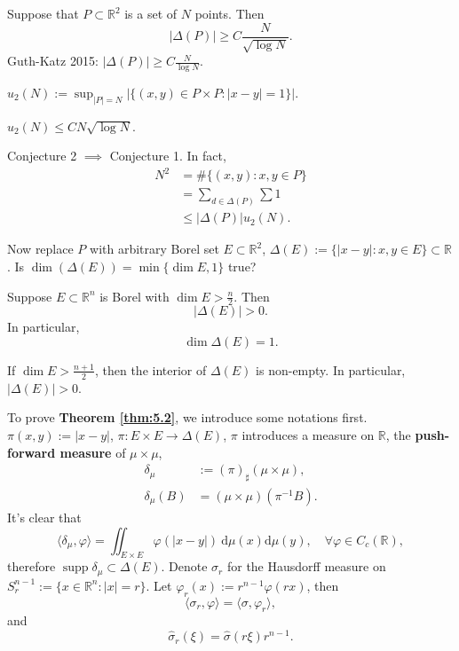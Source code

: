 \begin{conjecture}
Suppose that $P \subset \mathbb{R}^{2}$ is a set of $N$ points. Then
$$
\lvert \Delta(P) \rvert \geq C \frac{N}{\sqrt{ \log N }}.
$$
	Guth-Katz 2015: $\displaystyle \lvert \Delta(P) \rvert \geq C \frac{N}{\log N}$.
\end{conjecture}

$\displaystyle u_{2}(N):=\sup_{\lvert P \rvert=N} \left|\{ (x,y)\in P\times P:\lvert x-y \rvert=1 \}\right|.$

\begin{conjecture}
$\displaystyle u_{2}(N)\leq CN\sqrt{ \log N }$.
\end{conjecture}

\begin{remark}\label{rmk:conjecture_relation}
Conjecture 2 $\implies$ Conjecture 1. In fact,
$$
\begin{aligned}
N^{2} & =\#\{ (x,y):x,y \in P \} \\
 & =\sum _{d \in \Delta(P)}\sum 1 \\
 & \leq \lvert \Delta(P) \rvert u_{2}(N).
\end{aligned}
$$
\end{remark}

Now replace $P$ with arbitrary Borel set $E \subset \mathbb{R}^{2}$, $\Delta(E):=\{ \lvert x-y \rvert:x,y \in E \}\subset \mathbb{R}$. Is $\operatorname{dim}(\Delta(E))=\min \{ \operatorname{dim}E,1 \}$ true?

\begin{conjecture}[Falconer]
Suppose $E \subset \mathbb{R}^{n}$ is Borel with $\operatorname{dim} E > \frac{n}{2}$. Then
$$
\lvert \Delta(E) \rvert >0.
$$
In particular,
$$
\operatorname{dim}\Delta(E)=1.
$$
\end{conjecture}

\begin{theorem}\label{thm:5.2}
If $\operatorname{dim}E> \frac{n+1}{2}$, then the interior of $\Delta(E)$ is non-empty. In particular, $\lvert \Delta(E) \rvert>0$.
\end{theorem}

To prove \textbf{Theorem \ref{thm:5.2}}, we introduce some notations first.
$\pi(x,y):=\lvert x-y \rvert$, $\pi:E\times E\to \Delta(E)$, $\pi$ introduces a measure on $\mathbb{R}$, the \textbf{push-forward measure} of $\mu\times \mu$,
$$
\begin{aligned}
\delta _{\mu} & :=(\pi)_{\sharp}(\mu \times \mu), \\
\delta _{\mu}(B) & =(\mu \times \mu)(\pi ^{-1}B).
\end{aligned}
$$
It's clear that
$$
\langle \delta _{\mu},\varphi \rangle =\iint _{E\times E}\varphi(\lvert x-y \rvert )\ \mathrm{d}\mu(x)\mathrm{d}\mu(y), \quad\forall \varphi \in C_{c}(\mathbb{R}),
$$
therefore $\operatorname{supp} \delta _{\mu}\subset \Delta(E)$.
Denote $\sigma _{r}$ for the Hausdorff measure on $S_{r}^{n-1}:=\{ x \in \mathbb{R}^{n}:\lvert x \rvert=r \}$. Let $\varphi _{r}(x):=r^{n-1}\varphi(rx)$, then
$$
\langle \sigma _{r},\varphi \rangle =\langle \sigma,\varphi _{r} \rangle ,
$$
and
$$
\hat{\sigma}_{r}(\xi)=\hat{\sigma}(r\xi)r^{n-1}.
$$

